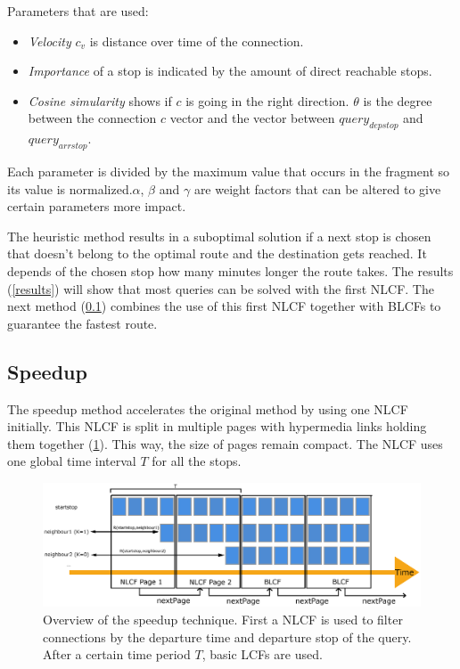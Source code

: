 \documentclass[twocolumn]{phdsymp} %
\begin{document}
Parameters that are used:
\begin{itemize}
\item \textit{Velocity} $c_{v}$ is distance over time of the connection.
\item \textit{Importance} of a stop is indicated by the amount of direct reachable stops.
\item \textit{Cosine simularity} shows if $c$ is going in the right direction. $\theta$ is the degree between the connection $c$ vector and the vector between $query_{depstop}$ and $query_{arrstop}$.
\end{itemize}

Each parameter is divided by the maximum value that occurs in the fragment so its value is normalized.$\alpha$, $\beta$ and $\gamma$ are weight factors that can be altered to give certain parameters more impact.

The heuristic method results in a suboptimal solution if a next stop is chosen that doesn't belong to the optimal route and the destination gets reached. It depends of the chosen stop how many minutes longer the route takes. The results (\cref{results}) will show that most queries can be solved with the first NLCF.
The next method (\cref{speedup}) combines the use of this first NLCF together with BLCFs to guarantee the fastest route.

\subsection{Speedup}
\label{speedup}

The speedup method accelerates the original method by using one NLCF initially. This NLCF is split in multiple pages with hypermedia links holding them together (\cref{NLCFpaged}). This way, the size of pages remain compact. The NLCF uses one global time interval $T$ for all the stops.

\begin{figure}[ht]
\begin{center}
	\includegraphics[width=.50\textwidth]{NLCFpaged}
	\caption{\label{NLCFpaged}Overview of the speedup technique. First a NLCF is used to filter connections by the departure time and departure stop of the query. After a certain time period $T$, basic LCFs are used.}
\end{center}
\end{figure}
\end{document}
